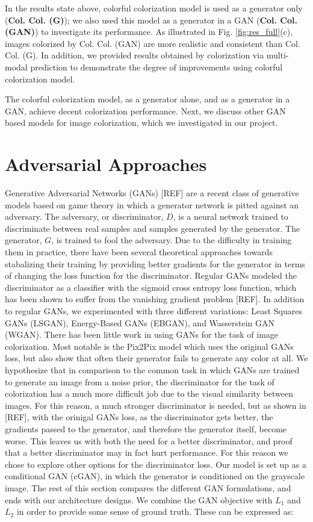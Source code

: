 \documentclass[10pt]{article}
\begin{document}
In the results state above, colorful colorization model is used as a generator only (\textbf{Col. Col. (G)}); we also used this model as a generator in a GAN (\textbf{Col. Col. (GAN)}) to investigate its performance. As illustrated in Fig. \ref{fig:res_full}(c), images colorized  by Col. Col. (GAN) are more realistic and consistent than Col. Col. (G). In addition, we provided results obtained by colorization via multi-modal prediction \cite{charpiat2008automatic} to demonstrate the degree of improvements using colorful colorization model. 

The colorful colorization model, as a generator alone, and as a generator in a GAN, achieve decent colorization performance. Next, we discuss other GAN based models for image colorization, which we investigated in our project. 

\section{Adversarial Approaches}
Generative Adversarial Networks (GANs) [REF] are a recent class of generative models based on game theory
in which a generator network is pitted against an adversary. The adversary, or discriminator, $D$, is a 
neural network trained to discriminate between real samples and samples generated by the generator. The
generator, $G$, is trained to fool the adversary. Due to the difficulty in
training them in practice, there have been several theoretical approaches towards stabalizing their training
by providing better gradients for the generator in terms of changing the loss function for the discriminator.
Regular GANs modeled the discriminator as a classifier with the sigmoid cross entropy loss function,
which has been shown to suffer from the vanishing gradient problem [REF]. In addition to regular GANs,
we experimented with three different variations: Least Squares GANs (LSGAN), Energy-Based GANs (EBGAN), and Wasserstein GAN
(WGAN). There has been little work in using GANs for the task of image colorization. Most notable is the
Pix2Pix model which uses the original GANs loss, but also show that often their generator fails to generate
any color at all. We hypothesize that in comparison to the common task in which GANs are trained to generate
an image from a noise prior, the discriminator for the task of colorization has a much more difficult job
due to the visual similarity between images. For this reason, a much stronger discriminator is needed, but
as shown in [REF], with the orinigal GANs loss, as the discriminator gets better, the gradients passed to the
generator, and therefore the generator itself, become worse. This leaves us with both the need for a better discriminator,
and proof that a better discriminator may in fact hurt performance. For this reason we chose to explore other
options for the discriminator loss. Our model is set up as a conditional GAN (cGAN), in which the
generator is conditioned on the grayscale image. The rest of this section compares the different GAN
formulations, and ends with our architecture designs. We combine the GAN objective with $L_1$ and $L_2$ in
order to provide some sense of ground truth. These can be expressed as:
\end{document}
